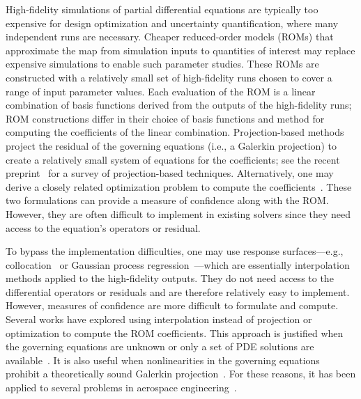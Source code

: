 \documentclass[final]{siamltex}
\begin{document}
High-fidelity simulations of partial differential equations are
typically too expensive for design optimization and uncertainty
quantification, where many independent runs are necessary. Cheaper
reduced-order models (ROMs) that approximate the map from simulation
inputs to quantities of interest may replace expensive simulations to
enable such parameter studies. These ROMs are constructed with a
relatively small set of high-fidelity runs chosen to cover a range of
input parameter values. Each evaluation of the ROM is a linear
combination of basis functions derived from the outputs of the
high-fidelity runs; ROM constructions differ in their choice of basis
functions and method for computing the coefficients of the linear
combination. Projection-based methods project the residual of the
governing equations (i.e., a Galerkin projection) to create a
relatively small system of equations for the coefficients; see the
recent preprint~\cite{Benner2013} for a survey of projection-based
techniques. Alternatively, one may derive a closely related
optimization problem to compute the
coefficients~\cite{Bui2008,carlberg2013gnat,Constantine2012}. These
two formulations can provide a measure of confidence along with the
ROM. However, they are often difficult to implement in existing
solvers since they need access to the equation's operators or
residual.

To bypass the implementation difficulties, one may use response
surfaces---e.g., collocation~\cite{Babuska2007,Xiu2005} or Gaussian
process regression~\cite{Rasmussen2006}---which are essentially
interpolation methods applied to the high-fidelity outputs. They do
not need access to the differential operators or residuals and are
therefore relatively easy to implement. However, measures of confidence
are more difficult to formulate and compute. Several works have
explored using interpolation instead of projection or optimization to
compute the ROM coefficients. This approach is justified when the
governing equations are unknown or only a set of PDE solutions are
available~\cite{ly2001modeling}. It is also useful when nonlinearities
in the governing equations prohibit a theoretically sound Galerkin
projection~\cite{audouze2009reduced,audouze2013nonintrusive}. For
these reasons, it has been applied to several problems in aerospace
engineering~\cite{Bui2003,lee2011reduced,goss2008inlet,ostrowski2005estimation}.
\end{document}
